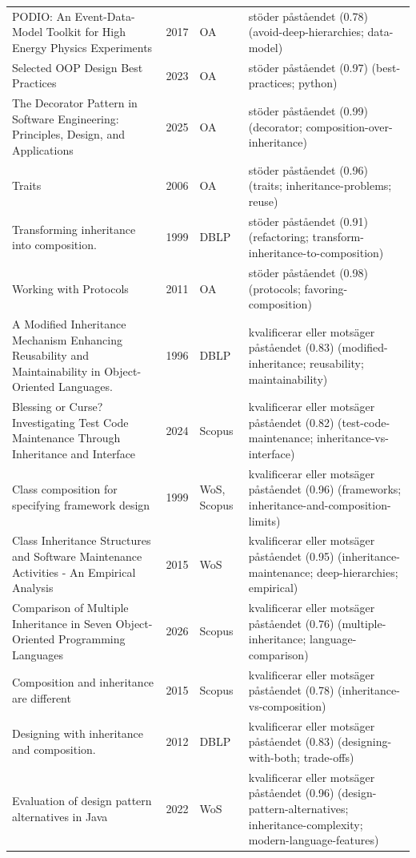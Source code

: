 \begin{longtable}{@{}%
  >{\raggedright\arraybackslash}p{}c%
  >{\raggedright\arraybackslash}p{}%
  >{\raggedright\arraybackslash}p{}@{}}
PODIO: An Event-Data-Model Toolkit for High Energy Physics Experiments & 2017 & OA & stöder påståendet (0.78) (avoid-deep-hierarchies; data-model) \\
Selected OOP Design Best Practices & 2023 & OA & stöder påståendet (0.97) (best-practices; python) \\
The Decorator Pattern in Software Engineering: Principles, Design, and Applications & 2025 & OA & stöder påståendet (0.99) (decorator; composition-over-inheritance) \\
Traits & 2006 & OA & stöder påståendet (0.96) (traits; inheritance-problems; reuse) \\
Transforming inheritance into composition. & 1999 & DBLP & stöder påståendet (0.91) (refactoring; transform-inheritance-to-composition) \\
Working with Protocols & 2011 & OA & stöder påståendet (0.98) (protocols; favoring-composition) \\
A Modified Inheritance Mechanism Enhancing Reusability and Maintainability in Object-Oriented Languages. & 1996 & DBLP & kvalificerar eller motsäger påståendet (0.83) (modified-inheritance; reusability; maintainability) \\
Blessing or Curse? Investigating Test Code Maintenance Through Inheritance and Interface & 2024 & Scopus & kvalificerar eller motsäger påståendet (0.82) (test-code-maintenance; inheritance-vs-interface) \\
Class composition for specifying framework design & 1999 & WoS, Scopus & kvalificerar eller motsäger påståendet (0.96) (frameworks; inheritance-and-composition-limits) \\
Class Inheritance Structures and Software Maintenance Activities - An Empirical Analysis & 2015 & WoS & kvalificerar eller motsäger påståendet (0.95) (inheritance-maintenance; deep-hierarchies; empirical) \\
Comparison of Multiple Inheritance in Seven Object-Oriented Programming Languages & 2026 & Scopus & kvalificerar eller motsäger påståendet (0.76) (multiple-inheritance; language-comparison) \\
Composition and inheritance are different & 2015 & Scopus & kvalificerar eller motsäger påståendet (0.78) (inheritance-vs-composition) \\
Designing with inheritance and composition. & 2012 & DBLP & kvalificerar eller motsäger påståendet (0.83) (designing-with-both; trade-offs) \\
Evaluation of design pattern alternatives in Java & 2022 & WoS & kvalificerar eller motsäger påståendet (0.96) (design-pattern-alternatives; inheritance-complexity; modern-language-features) \\

\end{longtable}
